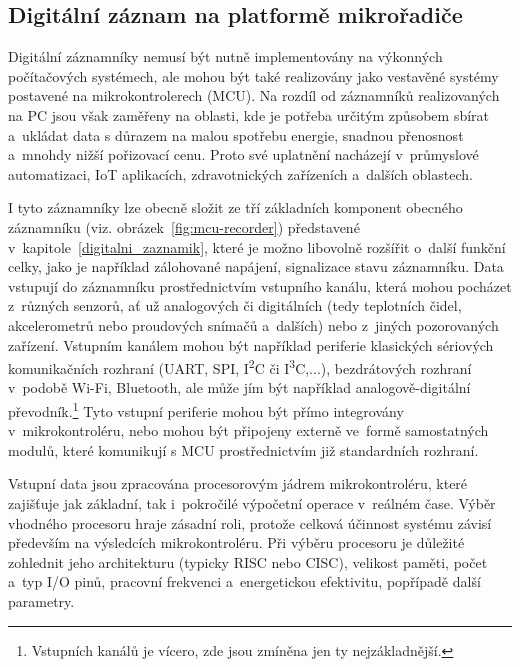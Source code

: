 
\subsection{Digitální záznam na platformě mikrořadiče}
\label{digitalni_zaznamnik_mikroradic}
Digitální záznamníky nemusí být nutně implementovány na výkonných počítačových systémech, ale mohou být také realizovány jako vestavěné systémy postavené na mikrokontrolerech (MCU). Na rozdíl od záznamníků realizovaných na PC jsou však zaměřeny na oblasti, kde je potřeba určitým způsobem sbírat a~ukládat data s důrazem na malou spotřebu energie, snadnou přenosnost a~mnohdy nižší pořizovací cenu. Proto své uplatnění nacházejí v~průmyslové automatizaci, IoT aplikacích, zdravotnických zařízeních a~dalších oblastech.~\cite{iot_datalogger_with_timestamping, researchgate_general_dataloggger_multiple_sdcards}

I tyto záznamníky lze obecně složit ze tří základních komponent obecného záznamníku (viz. obrázek~\ref{fig:mcu-recorder}) představené v~kapitole~\ref{digitalni_zaznamik}, které je možno libovolně rozšířit o~další funkční celky, jako je například zálohované napájení, signalizace stavu záznamníku. Data vstupují do záznamníku prostřednictvím vstupního kanálu, která mohou pocházet z~různých senzorů, ať už analogových či digitálních (tedy teplotních čidel, akcelerometrů nebo proudových snímačů a~dalších) nebo z~jiných pozorovaných zařízení. Vstupním kanálem mohou být například periferie klasických sériových komunikačních rozhraní (UART, SPI, I\textsuperscript{2}C či I\textsuperscript{3}C,...), bezdrátových rozhraní v~podobě Wi-Fi, Bluetooth, ale může jím být například analogově-digitální převodník.\footnote{Vstupních kanálů je vícero, zde jsou zmíněna jen ty nejzákladnější.} Tyto vstupní periferie mohou být přímo integrovány v~mikrokontroléru, nebo mohou být připojeny externě ve~formě samostatných modulů, které komunikují s MCU prostřednictvím již standardních rozhraní.~\cite{ieee_digital_sound_recorder_arm_sd_card}

Vstupní data jsou zpracována procesorovým jádrem mikrokontroléru, které zajišťuje jak základní, tak i~pokročilé výpočetní operace v~reálném čase. Výběr vhodného procesoru hraje zásadní roli, protože celková účinnost systému závisí především na výsledcích mikrokontroléru. Při výběru procesoru je důležité zohlednit jeho architekturu (typicky RISC nebo CISC), velikost paměti, počet a~typ I/O pinů, pracovní frekvenci a~energetickou efektivitu, popřípadě další parametry.~\cite{smart_datalogger_data_acquisition_cpu, ieee_digital_sound_recorder_arm_sd_card}

